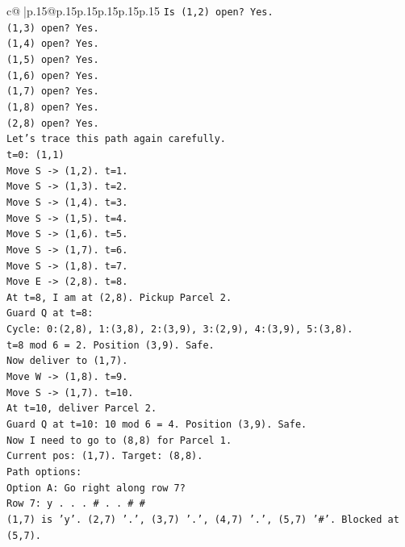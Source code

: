 \documentclass{article}
\begin{document}
{\begin{supertabular}{c@{$\;$}|p{.15\linewidth}@{}p{.15\linewidth}p{.15\linewidth}p{.15\linewidth}p{.15\linewidth}p{.15\linewidth}}
{{{\texttt{Is (1,2) open? Yes.} \\
\texttt{(1,3) open? Yes.} \\
\texttt{(1,4) open? Yes.} \\
\texttt{(1,5) open? Yes.} \\
\texttt{(1,6) open? Yes.} \\
\texttt{(1,7) open? Yes.} \\
\texttt{(1,8) open? Yes.} \\
\texttt{(2,8) open? Yes.} \\
\texttt{Let's trace this path again carefully.} \\
\texttt{t=0: (1,1)} \\
\texttt{Move S {-}> (1,2). t=1.} \\
\texttt{Move S {-}> (1,3). t=2.} \\
\texttt{Move S {-}> (1,4). t=3.} \\
\texttt{Move S {-}> (1,5). t=4.} \\
\texttt{Move S {-}> (1,6). t=5.} \\
\texttt{Move S {-}> (1,7). t=6.} \\
\texttt{Move S {-}> (1,8). t=7.} \\
\texttt{Move E {-}> (2,8). t=8.} \\
\texttt{At t=8, I am at (2,8). Pickup Parcel 2.} \\
\texttt{Guard Q at t=8:} \\
\texttt{Cycle: 0:(2,8), 1:(3,8), 2:(3,9), 3:(2,9), 4:(3,9), 5:(3,8).} \\
\texttt{t=8 mod 6 = 2. Position (3,9). Safe.} \\
\texttt{Now deliver to (1,7).} \\
\texttt{Move W {-}> (1,8). t=9.} \\
\texttt{Move S {-}> (1,7). t=10.} \\
\texttt{At t=10, deliver Parcel 2.} \\
\texttt{Guard Q at t=10: 10 mod 6 = 4. Position (3,9). Safe.} \\
\texttt{Now I need to go to (8,8) for Parcel 1.} \\
\texttt{Current pos: (1,7). Target: (8,8).} \\
\texttt{Path options:} \\
\texttt{Option A: Go right along row 7?} \\
\texttt{Row 7: y . . . \# . . \# \#} \\
\texttt{(1,7) is 'y'. (2,7) '.', (3,7) '.', (4,7) '.', (5,7) '\#'. Blocked at (5,7).} \\
}}}
\end{supertabular}}
\end{document}
